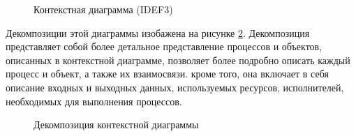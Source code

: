 \documentclass[14pt]{extreport}
\begin{document}
        \begin{figure}[H]%
            \centering
            \caption{Контекстная диаграмма (IDEF3)} \label{context-diagram}
        \end{figure} 
        
        Декомпозиции этой диаграммы изобажена на рисунке \ref{context-decomposition}. %
        Декомпозиция представляет собой более детальное %
        представление процессов и объектов, описанных в контекстной диаграмме, позволяет %
        более подробно описать каждый процесс и объект, а также их взаимосвязи. кроме того, %
        она включает в себя описание входных и выходных данных, используемых ресурсов, %
        исполнителей, необходимых для выполнения процессов.


        \begin{landscape}
            \begin{figure}[H]%
                \centering
                \caption{Декомпозиция контекстной диаграммы} \label{context-decomposition}
            \end{figure} 
        \end{landscape}
\end{document}
